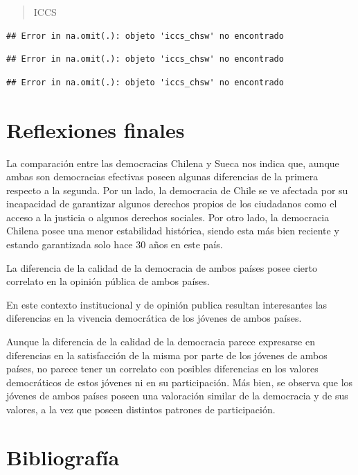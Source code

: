 \documentclass[12pt,twoside]{templates/facsothesis}
\begin{document}
\begin{quote}
ICCS
\end{quote}

\begin{verbatim}
## Error in na.omit(.): objeto 'iccs_chsw' no encontrado
\end{verbatim}

\begin{verbatim}
## Error in na.omit(.): objeto 'iccs_chsw' no encontrado
\end{verbatim}

\begin{verbatim}
## Error in na.omit(.): objeto 'iccs_chsw' no encontrado
\end{verbatim}

\hypertarget{reflexiones-finales}{%
\chapter{Reflexiones finales}\label{reflexiones-finales}}

La comparación entre las democracias Chilena y Sueca nos indica que, aunque ambas son democracias efectivas poseen algunas diferencias de la primera respecto a la segunda. Por un lado, la democracia de Chile se ve afectada por su incapacidad de garantizar algunos derechos propios de los ciudadanos como el acceso a la justicia o algunos derechos sociales. Por otro lado, la democracia Chilena posee una menor estabilidad histórica, siendo esta más bien reciente y estando garantizada solo hace 30 años en este país.

La diferencia de la calidad de la democracia de ambos países posee cierto correlato en la opinión pública de ambos países.

En este contexto institucional y de opinión publica resultan interesantes las diferencias en la vivencia democrática de los jóvenes de ambos países.

Aunque la diferencia de la calidad de la democracia parece expresarse en diferencias en la satisfacción de la misma por parte de los jóvenes de ambos países, no parece tener un correlato con posibles diferencias en los valores democráticos de estos jóvenes ni en su participación. Más bien, se observa que los jóvenes de ambos países poseen una valoración similar de la democracia y de sus valores, a la vez que poseen distintos patrones de participación.

\hypertarget{bibliografuxeda}{%
\chapter*{Bibliografía}\label{bibliografuxeda}}
\end{document}
